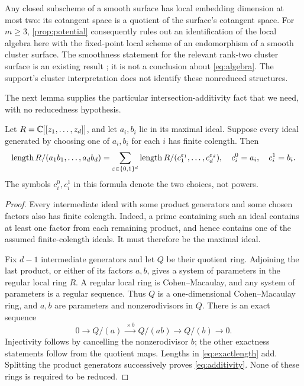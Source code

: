 \begin{remark}\label{rem:ambient}
Any closed subscheme of a smooth surface has local embedding dimension
at most two: its cotangent space is a quotient of the surface's cotangent
space. For $m\geq3$, \cref{prop:potential} consequently rules out an
identification of the local algebra here with the fixed-point local scheme
of an endomorphism of a smooth cluster surface. The smoothness statement
for the relevant rank-two cluster surface is an existing result
\cite[Theorem~5.2.3 in arXiv v2]{BFMS}; it is not a conclusion about
\eqref{eq:algebra}. The support's cluster interpretation does not identify
these nonreduced structures.
\end{remark}

The next lemma supplies the particular intersection-additivity fact that
we need, with no reducedness hypothesis.

\begin{lemma}\label{lem:additivity}
Let $R=\mathbb C[[z_1,\ldots,z_d]]$, and let $a_i,b_i$ lie in its maximal ideal.
Suppose every ideal
generated by choosing one of $a_i,b_i$ for each $i$ has finite colength.
Then
\begin{equation}\label{eq:additivity}
 \operatorname{length} R/(a_1b_1,\ldots,a_db_d)
 =\sum_{\varepsilon\in\{0,1\}^d}
  \operatorname{length} R/(c_1^{\varepsilon_1},\ldots,c_d^{\varepsilon_d}),
 \quad c_i^0=a_i,\quad c_i^1=b_i.
\end{equation}
The symbols $c_i^0,c_i^1$ in this formula denote the two choices, not powers.
\end{lemma}

\begin{proof}
Every intermediate ideal with some product generators and some chosen
factors also has finite colength. Indeed, a prime containing such an ideal
contains at least one factor from each remaining product, and hence contains
one of the assumed finite-colength ideals. It must therefore be the
maximal ideal.

Fix $d-1$ intermediate generators and let $Q$ be their quotient ring.
Adjoining the last product, or either of its factors $a,b$, gives a system
of parameters in the regular local ring $R$. A regular local ring is
Cohen--Macaulay, and any system of parameters is a regular sequence.
Thus $Q$ is a one-dimensional Cohen--Macaulay ring, and $a,b$ are parameters
and nonzerodivisors in $Q$. There is an exact sequence
\begin{equation}\label{eq:exactlength}
 0\longrightarrow Q/(a)
 \xrightarrow{\ \times b\ } Q/(ab)
 \longrightarrow Q/(b)\longrightarrow0.
\end{equation}
Injectivity follows by cancelling the nonzerodivisor $b$; the other
exactness statements follow from the quotient maps. Lengths in
\eqref{eq:exactlength} add. Splitting the product generators successively
proves \eqref{eq:additivity}. None of these rings is required to be reduced.
\end{proof}

